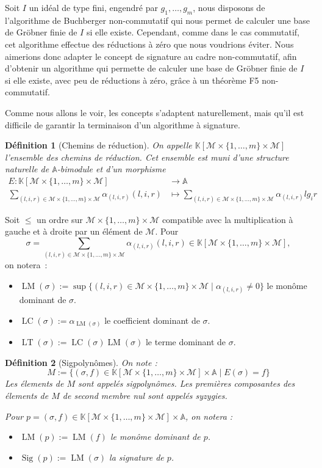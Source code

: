 \documentclass{article}
\newtheorem*{dfn}{Définition}
\newcommand{\K}{\mathbb{K}}
\newcommand{\A}{\mathbb{A}}
\newcommand{\M}{\mathcal{M}}
\newcommand{\CR}{\K[\M\times\{1, \dots, m\}\times\M]}
\DeclareMathOperator{\LM}{LM}
\DeclareMathOperator{\LC}{LC}
\DeclareMathOperator{\LT}{LT}
\DeclareMathOperator{\Sig}{Sig}
\begin{document}
Soit $I$ un idéal de type fini, engendré par $g_1, \dots, g_m$, nous disposons de l'algorithme de Buchberger non-commutatif qui nous permet de calculer une base de Gröbner finie de $I$ si elle existe. Cependant, comme dans le cas commutatif, cet algorithme effectue des réductions à zéro que nous voudrions éviter.
Nous aimerions donc adapter le concept de signature au cadre non-commutatif, afin d'obtenir un algorithme qui permette de calculer une base de Gröbner finie de $I$ si elle existe, avec peu de réductions à zéro, grâce à un théorème F5 non-commutatif.

Comme nous allons le voir, les concepts s'adaptent naturellement, mais qu'il est difficile de garantir la terminaison d'un algorithme à signature.

\begin{dfn}[Chemins de réduction]
	On appelle $\CR$ l'ensemble des chemins de réduction.
	Cet ensemble est muni d'une structure naturelle de $\A$-bimodule et d'un morphisme 
	\begin{align*}
		E : \CR &\rightarrow \A \\
		\sum_{(l, i, r) \in \M\times\{1,\dots,m\}\times\M} \alpha_{(l,i,r)}(l,i,r) &\mapsto \sum_{(l, i, r) \in \M\times\{1,\dots,m\}\times\M} \alpha_{(l,i,r)}lg_ir
	\end{align*}
\end{dfn}

Soit $\leq$ un ordre sur $\M\times\{1,\dots,m\}\times\M$ compatible avec la multiplication à gauche et à droite par un élément de $\M$.
Pour 
$$\sigma = \sum_{(l, i, r) \in \M\times\{1,\dots,m\}\times\M} \alpha_{(l,i,r)}(l,i,r) \in \CR,$$
on notera~:
\begin{itemize}
\item $\LM(\sigma) := \sup \{ (l, i, r) \in \M\times\{1,\dots,m\}\times\M \;|\; \alpha_{(l, i, r)} \neq 0 \}$ le monôme dominant de $\sigma$.
\item $\LC(\sigma) := \alpha_{\LM(\sigma)}$ le coefficient dominant de $\sigma$.
\item $\LT(\sigma) := \LC(\sigma)\LM(\sigma)$ le terme dominant de $\sigma$.
\end{itemize}

\begin{dfn}[Sigpolynômes]
	On note :
	$$M := \{(\sigma, f) \in \CR\times\A \;|\; E(\sigma) = f\}$$
	Les élements de $M$ sont appelés sigpolynômes.
	Les premières composantes des élements de $M$ de second membre nul sont appelés syzygies.
	
	Pour $p = (\sigma, f) \in \CR\times\A$, on notera :
	\begin{itemize}
	\item $\LM(p) := \LM(f)$ le monôme dominant de $p$.
	\item $\Sig(p) := \LM(\sigma)$ la signature de $p$.
	\end{itemize}
\end{dfn}
\end{document}
